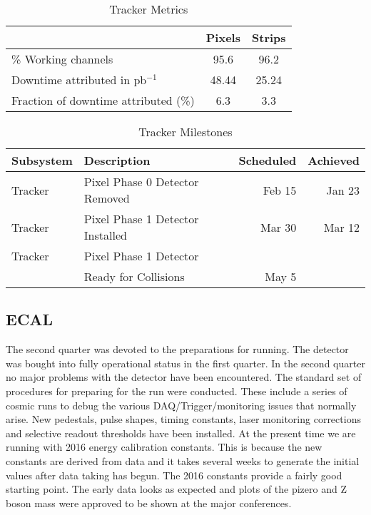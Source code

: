 \vskip 0.2in

\begin{table}[htp]
\caption{Tracker Metrics}
\begin{center}
\begin{tabular}{|l|c|c|}
\hline
 &Pixels&Strips\\
\hline
\% Working channels & 95.6 &  96.2 \\
\hline
Downtime attributed in pb$^{-1}$& 48.44 & 25.24 \\
Fraction of downtime attributed (\%)& 6.3 & 3.3\\
\hline
\end{tabular}
\end{center}
\label{TrackerMetrics}
\end{table}%


\begin{table}[htp]
\caption{Tracker Milestones}
\begin{center}
\begin{tabular}{|l|l|r|r|}
\hline
Subsystem&Description&Scheduled&Achieved\\
\hline
Tracker & Pixel Phase 0 Detector Removed&Feb 15&Jan 23 \\
\hline
Tracker & Pixel Phase 1 Detector Installed &Mar 30 &Mar 12 \\
\hline
Tracker & Pixel Phase 1 Detector & & \\ 
        & Ready for Collisions  &May 5 & \\
\hline
\end{tabular}
\end{center}
\label{TrackerMilestones}
\end{table}%



\subsection{ECAL }
The second quarter was devoted to the preparations for running. The detector was bought into fully operational status in the first quarter. In the second quarter no major problems with the detector have been encountered. The standard set of procedures for preparing for the run were conducted.  These include a series of cosmic runs to debug the various DAQ/Trigger/monitoring issues that normally arise. New pedestals, pulse shapes, timing constants, laser monitoring corrections and selective readout thresholds have been installed. At the present time we are running with 2016 energy calibration constants. This is because the new constants are derived from data and it takes several weeks to generate the initial values after data taking has begun. The 2016 constants provide a fairly good starting point. The early data looks as expected and plots of the pizero and Z boson mass were approved to be shown at the major conferences. 



